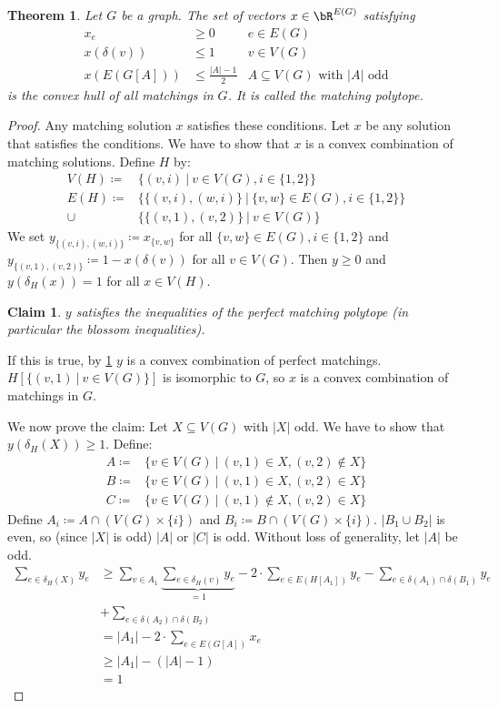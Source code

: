 \documentclass[11pt, a4paper]{article}
\newcommand{\abs}[1]{\left\lvert#1\right\rvert}
\newcommand{\set}[1]{\{#1\}}
\newtheorem{theorem}{Theorem}[section]
\newtheorem*{claim}{Claim}
\theoremstyle{remark}
\theoremstyle{definition}
\begin{document}
\begin{theorem}\label{thm:perf-match-poly}
Let $G$ be a graph. The set of vectors $x\in\bR^{E(G)}$ satisfying
\begin{align*}
	x_e&\geq0 &e\in E(G) \\
	x(\delta(v))&\leq1 &v\in V(G) \\
	x(E(G[A]))&\leq\frac{\abs{A}-1}{2}
		&A\subseteq V(G)\text{ with $\abs{A}$ odd}
\end{align*}
is the convex hull of all matchings in $G$. It is called the \emph{matching
polytope}.
\end{theorem}
\begin{proof}
Any matching solution $x$ satisfies these conditions. Let $x$ be any
solution that satisfies the conditions. We have to show that $x$ is a
convex combination of matching solutions. Define $H$ by:
\begin{align*}
	V(H)\coloneqq &\set{(v,i)\ |\ v\in V(G),i\in\set{1,2}} \\
	E(H)\coloneqq &\set{\set{(v,i),(w,i)}\ |\ \set{v,w}\in E(G),i\in\set{1,2}} \\
	\cup &\set{\set{(v,1),(v,2)}\ |\ v\in V(G)}
\end{align*}
We set $y_{\set{(v,i),(w,i)}}\coloneqq x_{\set{v,w}}$ for all $\set{v,w}
\in E(G),i\in\set{1,2}$ and $y_{\set{(v,1),(v,2)}}\coloneqq 1-x(\delta(v))$
for all $v\in V(G)$. Then $y\geq0$ and $y(\delta_H(x))=1$ for all
$x\in V(H)$.
\begin{claim}
$y$ satisfies the inequalities of the perfect matching polytope
(in particular the blossom inequalities).
\end{claim}
If this is true, by \ref{thm:perf-match-poly} $y$ is a convex combination
of perfect matchings. $H[\set{(v,1)\ |\ v\in V(G)}]$ is isomorphic to $G$,
so $x$ is a convex combination of matchings in $G$.

We now prove the claim:
Let $X\subseteq V(G)$ with $\abs{X}$ odd. We have to show that
$y(\delta_H(X))\geq1$. Define:
\begin{align*}
	A\coloneqq&\set{v\in V(G)\ |\ (v,1)\in X,(v,2)\notin X} \\
	B\coloneqq&\set{v\in V(G)\ |\ (v,1)\in X, (v,2)\in X} \\
	C\coloneqq&\set{v\in V(G)\ |\ (v,1)\notin X,(v,2)\in X}
\end{align*}
Define $A_i\coloneqq A\cap (V(G)\times \set{i})$ and $B_i\coloneqq B\cap
(V(G)\times \set{i})$. $\abs{B_1\cup B_2}$ is even, so (since $\abs{X}$ is
odd) $\abs{A}$ or $\abs{C}$ is odd. Without loss of generality, let $\abs{A}$
be odd.
\begin{align*}
	\sum_{e\in\delta_H(X)}y_e
	&\geq \sum_{v\in A_1}\underbrace{\sum_{e\in\delta_H(v)}y_e}_{=1}
		-2\cdot\sum_{e\in E(H[A_1])}y_e-\sum_{e\in \delta(A_1)\cap\delta(B_1)}y_e \\
	&+\sum_{e\in \delta(A_2)\cap\delta(B_2)} \\
	&=\abs{A_1}-2\cdot\sum_{e\in E(G[A])}x_e \\
	&\geq \abs{A_1}-(\abs{A}-1) \\
	&=1
\end{align*}

\end{proof}
\end{document}
